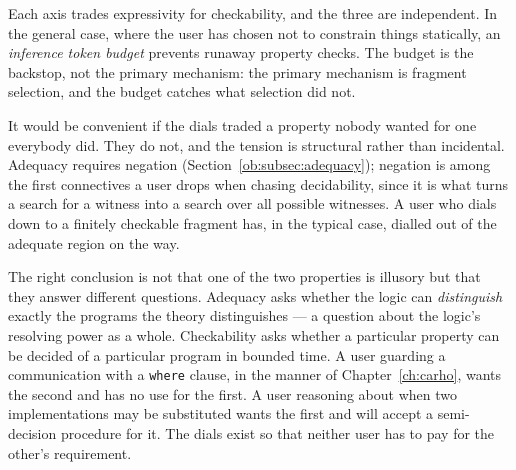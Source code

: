 Each axis trades expressivity for checkability, and the three are independent. In the
general case, where the user has chosen not to constrain things statically, an
\emph{inference token budget} prevents runaway property checks. The budget is the backstop,
not the primary mechanism: the primary mechanism is fragment selection, and the budget
catches what selection did not.

\begin{remark}
\label{ob:rem:tension}
It would be convenient if the dials traded a property nobody wanted for one everybody did.
They do not, and the tension is structural rather than incidental. Adequacy requires
negation (Section~\ref{ob:subsec:adequacy}); negation is among the first connectives a user
drops when chasing decidability, since it is what turns a search for a witness into a
search over all possible witnesses. A user who dials down to a finitely checkable fragment
has, in the typical case, dialled out of the adequate region on the way.

The right conclusion is not that one of the two properties is illusory but that they
answer different questions. Adequacy asks whether the logic can \emph{distinguish} exactly
the programs the theory distinguishes --- a question about the logic's resolving power as a
whole. Checkability asks whether a particular property can be decided of a particular
program in bounded time. A user guarding a communication with a \texttt{where} clause,
in the manner of Chapter~\ref{ch:carho}, wants the second and has no use for the first. A user reasoning about when two
implementations may be substituted wants the first and will accept a semi-decision
procedure for it. The dials exist so that neither user has to pay for the other's
requirement.
\end{remark}

